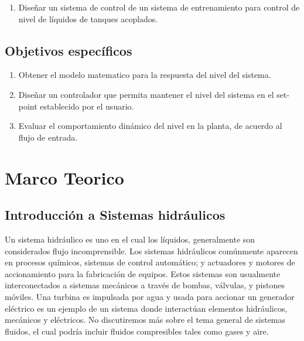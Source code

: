 \documentclass[a4paper,12pt,twoside]{proyectotanquesecci}
\begin{document}
\begin{enumerate}
\item Diseñar un sistema de control de un sistema de entrenamiento para control de nivel de líquidos de tanques acoplados.
\end{enumerate}

\section{Objetivos específicos}

\begin{enumerate}
\item Obtener el modelo matematico para la respuesta del nivel del sistema.
\item Diseñar un controlador que permita mantener el nivel del sistema en el set-point establecido por el usuario.
\item Evaluar el comportamiento dinámico del nivel en la planta, de acuerdo al flujo de entrada.
\end{enumerate}






\chapter{Marco Teorico}

\section{Introducción a Sistemas hidráulicos}

Un sistema hidráulico es uno en el cual los líquidos, generalmente son considerados flujo incomprensible. Los sistemas hidráulicos comúnmente aparecen en procesos químicos, sistemas de control automático; y actuadores y motores de accionamiento para la fabricación de equipos. Estos sistemas son usualmente interconectados a sistemas mecánicos a través de bombas, válvulas, y pistones móviles. Una turbina es impulsada por agua y usada para accionar un generador eléctrico es un ejemplo de un sistema donde interactúan elementos hidráulicos, mecánicos y eléctricos. No discutiremos más sobre el tema general de sistemas fluidos, el cual podría incluir fluidos compresibles tales como gases y aire. \\
\end{document}
